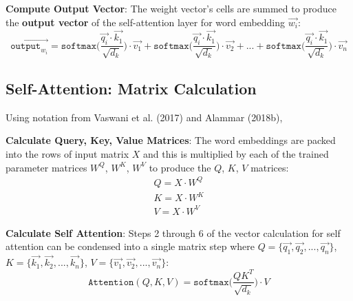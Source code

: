 \begin{enumerateSpaced}{2pt}
    \item \textbf{Compute Output Vector}: The weight vector's cells are summed to produce the \textbf{output vector} of the self-attention layer for word embedding $\overrightarrow{w_i}$: 
    $$
    \overrightarrow{\texttt{output}_{w_i}} = \texttt{softmax} \Bigg(
    \frac {\overrightarrow{q_i} \cdot \overrightarrow{k_1}} {\sqrt{d_k}} \Bigg) \cdot \overrightarrow{v_1} +
    \texttt{softmax} \Bigg(\frac {\overrightarrow{q_i} \cdot \overrightarrow{k_1}} {\sqrt{d_k}} \Bigg) \cdot \overrightarrow{v_2} + ... +
    \texttt{softmax} \Bigg(\frac {\overrightarrow{q_i} \cdot \overrightarrow{k_1}} {\sqrt{d_k}} \Bigg) \cdot \overrightarrow{v_n}
    $$
\end{enumerateSpaced} 


\subsection{Self-Attention: Matrix Calculation}

Using notation from Vaswani et al. (2017) and Alammar (2018b), 

\begin{enumerateSpaced}{2pt}
    \item \textbf{Calculate Query, Key, Value Matrices}: The word embeddings are packed into the rows of input matrix $X$ and this is multiplied by each of the trained parameter matrices $W^Q$, $W^K$, $W^V$ to produce the $Q$, $K$, $V$ matrices:
    $$
    \begin{array}{ll}
    Q = X \cdot W^Q \\
    K = X \cdot W^K \\
    V = X \cdot W^V 
    \end{array}
    $$
    
    \item \textbf{Calculate Self Attention}: Steps 2 through 6 of the vector calculation for self attention can be condensed into a single matrix step where $Q = \Big\{\overrightarrow{q_1}, \overrightarrow{q_2}, ..., \overrightarrow{q_n} \Big\}$, $K = \Big\{\overrightarrow{k_1}, \overrightarrow{k_2}, ..., \overrightarrow{k_n} \Big\}$, $V = \Big\{\overrightarrow{v_1}, \overrightarrow{v_2}, ..., \overrightarrow{v_n} \Big\}$: 
    $$
    \texttt{Attention}(Q, K, V) = \texttt{softmax} \Bigg(\frac {QK^T} {\sqrt{d_k}} \Bigg) \cdot V
    $$
\end{enumerateSpaced}